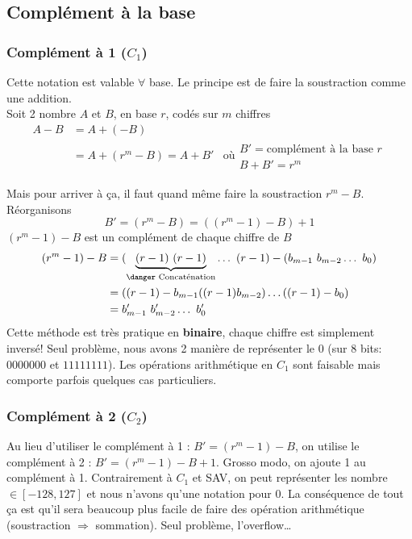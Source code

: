 \subsection{Complément à la base}
\subsubsection{Complément à 1 ($C_1$)}
Cette notation est valable $\forall$ base. Le principe est de faire la soustraction comme une addition.\\
Soit 2 nombre $A$ et $B$, en base $r$, codés sur $m$ chiffres
\begin{align}
	A-B &= A + (-B) & \\
	&= A + (r^m-B) = A+B'  &  \text{où}
	\begin{array}{l}
		B' = \text{complément à la base }r\\
		B+B'=r^m
	\end{array}
\end{align}

Mais pour arriver à ça, il faut quand même faire la soustraction $r^m-B$. Réorganisons
\begin{equation}
	B'=(r^m-B)=((r^m-1)-B)+1
\end{equation}
$(r^m-1)-B$ est un complément de chaque chiffre de $B$
\begin{align}
	(r^m-1)-B &=(\underbrace{(r-1)\ (r-1)}_{\text{\danger Concaténation}}\dots\ (r-1)-(b_{m-1}\ b_{m-2}\dots\ b_0)\\
	&= ((r-1)-b_{m-1}((r-1)b_{m-2})\dots((r-1)-b_0)\\
	&= b'_{m-1}\ b'_{m-2}\dots\ b'_0
\end{align}
Cette méthode est très pratique en \textbf{binaire}, chaque chiffre est simplement inversé! Seul problème, nous avons 2 manière de représenter le 0 (sur 8 bits: $0000000$ et $11111111$). Les opérations arithmétique en $C_1$ sont faisable mais comporte parfois quelques cas particuliers.
\subsubsection{Complément à 2 ($C_2$)}
Au lieu d'utiliser le complément à 1 : $B'=(r^m-1)-B$, on utilise le complément à 2 : $B'=(r^m-1)-B+1$. Grosso modo, on ajoute 1 au complément à 1. Contrairement à $C_1$ et SAV, on peut représenter les nombre $\in [-128,127]$ et nous n'avons qu'une notation pour 0. La conséquence de tout ça est qu'il sera beaucoup plus facile de faire des opération arithmétique (soustraction $\Rightarrow$ sommation). Seul problème, l'overflow\dots
